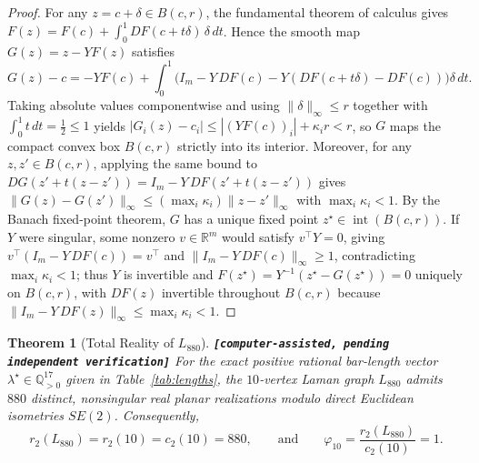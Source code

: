 \documentclass[11pt,a4paper]{article}
\newtheorem{theorem}{Theorem}
\theoremstyle{definition}
\theoremstyle{remark}
\newcommand{\claimtag}[1]{\textup{\textbf{\texttt{[#1]}}}}
\begin{document}
\begin{proof}
For any $z = c + \delta \in B(c,r)$, the fundamental theorem of calculus gives $F(z) = F(c) + \int_0^1 DF(c + t\delta)\,\delta\,dt$. Hence the smooth map $G(z) = z - Y F(z)$ satisfies
\[
G(z) - c = -Y F(c) + \int_0^1 \bigl(I_m - Y\,DF(c) - Y(DF(c+t\delta) - DF(c))\bigr)\delta\,dt.
\]
Taking absolute values componentwise and using $\|\delta\|_\infty \le r$ together with $\int_0^1 t\,dt = \frac{1}{2} \le 1$ yields $|G_i(z) - c_i| \le |(Y F(c))_i| + \kappa_i r < r$, so $G$ maps the compact convex box $B(c,r)$ strictly into its interior. Moreover, for any $z, z' \in B(c,r)$, applying the same bound to $DG(z' + t(z-z')) = I_m - Y\,DF(z' + t(z-z'))$ gives $\|G(z) - G(z')\|_\infty \le (\max_i \kappa_i)\|z - z'\|_\infty$ with $\max_i \kappa_i < 1$. By the Banach fixed-point theorem, $G$ has a unique fixed point $z^\star \in \operatorname{int}(B(c,r))$. If $Y$ were singular, some nonzero $v \in \mathbb{R}^m$ would satisfy $v^\top Y = 0$, giving $v^\top(I_m - Y\,DF(c)) = v^\top$ and $\|I_m - Y\,DF(c)\|_\infty \ge 1$, contradicting $\max_i \kappa_i < 1$; thus $Y$ is invertible and $F(z^\star) = Y^{-1}(z^\star - G(z^\star)) = 0$ uniquely on $B(c,r)$, with $DF(z)$ invertible throughout $B(c,r)$ because $\|I_m - Y\,DF(z)\|_\infty \le \max_i \kappa_i < 1$.
\end{proof}

\begin{theorem}[Total Reality of $L_{880}$]
\label{thm:main880}
\claimtag{computer-assisted, pending independent verification} For the exact positive rational bar-length vector $\lambda^\star \in \mathbb{Q}_{>0}^{17}$ given in Table~\ref{tab:lengths}, the $10$-vertex Laman graph $L_{880}$ admits $880$ distinct, nonsingular real planar realizations modulo direct Euclidean isometries $SE(2)$. Consequently,
\[
r_2(L_{880}) = r_2(10) = c_2(10) = 880, \qquad\text{and}\qquad \varphi_{10} = \frac{r_2(L_{880})}{c_2(10)} = 1.
\]
\end{theorem}
\end{document}
